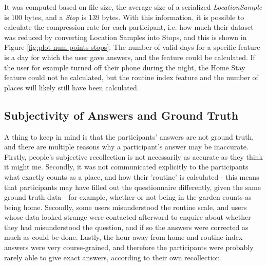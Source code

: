 It was computed based on file size, the average size of a serialized \textit{LocationSample} is 100 bytes, and a \textit{Stop} is 139 bytes. With this information, it is possible to calculate the compression rate for each participant, i.e. how much their dataset was reduced by converting Location Samples into Stops, and this is shown in Figure \ref{fig:plot-num-points-stops}. The number of valid days for a specific feature is a day for which the user gave answers, and the feature could be calculated. If the user for example turned off their phone during the night, the Home Stay feature could not be calculated, but the routine index feature and the number of places will likely still have been calculated.

\subsection{Subjectivity of Answers and Ground Truth}
A thing to keep in mind is that the participants' answers are not ground truth, and there are multiple reasons why a participant's answer may be inaccurate. Firstly, people's subjective recollection is not necessarily as accurate as they think it might me. Secondly, it was not communicated explicitly to the participants what exactly counts as a place, and how their 'routine' is calculated - this means that participants may have filled out the questionnaire differently, given the same ground truth data - for example, whether or not being in the garden counts as being home. Secondly, some users misunderstood the routine scale, and users whose data looked strange were contacted afterward to enquire about whether they had misunderstood the question, and if so the answers were corrected as much as could be done. Lastly, the hour away from home and routine index answers were very course-grained, and therefore the participants were probably rarely able to give exact answers, according to their own recollection. 

